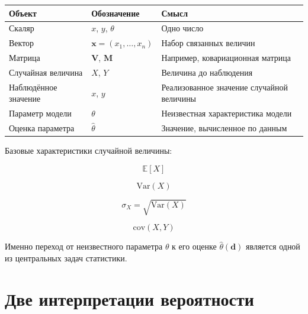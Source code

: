 \documentclass[
  russian,
  letterpaper,
]{scrbook}
\newcounter{none} %
\begin{document}
{\def\LTcaptype{none} %
\begin{longtable}[]{@{}
  >{\raggedright\arraybackslash}p{}
  >{\raggedright\arraybackslash}p{}
  >{\raggedright\arraybackslash}p{}@{}}
\toprule\noalign{}
\begin{minipage}[b]{\linewidth}\raggedright
Объект
\end{minipage} & \begin{minipage}[b]{\linewidth}\raggedright
Обозначение
\end{minipage} & \begin{minipage}[b]{\linewidth}\raggedright
Смысл
\end{minipage} \\
\midrule\noalign{}
\endhead
\bottomrule\noalign{}
\endlastfoot
Скаляр & \(x\), \(y\), \(\theta\) & Одно число \\
Вектор & \(\mathbf x=(x_1,\ldots,x_n)\) & Набор связанных величин \\
Матрица & \(\mathbf V\), \(\mathbf M\) & Например, ковариационная
матрица \\
Случайная величина & \(X\), \(Y\) & Величина до наблюдения \\
Наблюдённое значение & \(x\), \(y\) & Реализованное значение случайной
величины \\
Параметр модели & \(\theta\) & Неизвестная характеристика модели \\
Оценка параметра & \(\widehat{\theta}\) & Значение, вычисленное по
данным \\
\end{longtable}
}

Базовые характеристики случайной величины:

\[
\mathbb E[X]
\]

\[
\mathrm{Var}(X)
\]

\[
\sigma_X=\sqrt{\mathrm{Var}(X)}
\]

\[
\mathrm{cov}(X,Y)
\]

Именно переход от неизвестного параметра \(\theta\) к его оценке
\(\widehat{\theta}(\mathbf d)\) является одной из центральных задач
статистики.

\section{Две интерпретации
вероятности}\label{ux434ux432ux435-ux438ux43dux442ux435ux440ux43fux440ux435ux442ux430ux446ux438ux438-ux432ux435ux440ux43eux44fux442ux43dux43eux441ux442ux438}
\end{document}
